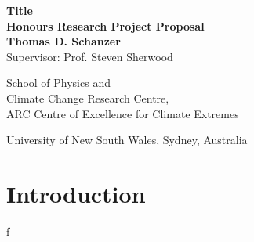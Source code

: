 \documentclass[12pt, titlepage]{article}
\begin{document}
\begin{titlepage}
\begin{center}
    \Huge{\textbf{%
        Title
    }} \\
    \vspace{0.75cm}
    \Large{\textbf{Honours Research Project Proposal}} \\
    \vspace{0.75cm}
    \Large{\textbf{Thomas D. Schanzer}} \\
    \vspace{6pt}
    \large{Supervisor: Prof. Steven Sherwood} \\
    \vspace{0.75cm}
    \large{%
        School of Physics and \\
        Climate Change Research Centre,\\
        ARC Centre of Excellence for Climate Extremes

        University of New South Wales, Sydney, Australia
    }
\end{center}
\vspace{2cm}
\tableofcontents
\end{titlepage}

\newpage
\pagestyle{fancy}
\thispagestyle{fancy}
\section{Introduction}
f
\end{document}
